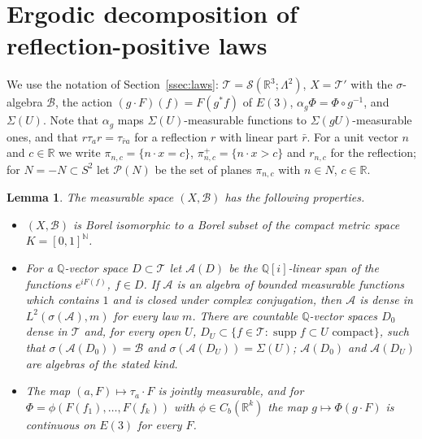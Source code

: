 \documentclass[11pt]{amsart}
\theoremstyle{plain}
\newtheorem{lemma}[theorem]{Lemma}
\theoremstyle{definition}
\theoremstyle{remark}
\numberwithin{equation}{section}
\newcommand{\R}{\mathbb{R}}
\newcommand{\N}{\mathbb{N}}
\newcommand{\Q}{\mathbb{Q}}
\newcommand{\cA}{\mathcal{A}}
\newcommand{\cB}{\mathcal{B}}
\newcommand{\cP}{\mathcal{P}}
\newcommand{\cT}{\mathcal{T}}
\newcommand{\cS}{\mathcal{S}}
\newcommand{\Eu}{E(3)}
\DeclareMathOperator{\supp}{supp}
\begin{document}
\appendix

\section{Ergodic decomposition of reflection-positive laws}\label{app:A}

We use the notation of Section~\ref{ssec:laws}: $\cT=\cS(\R^3;\Lambda^2)$, $X=\cT'$ with the $\sigma$-algebra $\cB$, the action $(g\cdot F)(f)=F(g^*f)$ of $\Eu$, $\alpha_g\Phi=\Phi\circ g^{-1}$, and $\Sigma(U)$. Note that $\alpha_g$ maps $\Sigma(U)$-measurable functions to $\Sigma(gU)$-measurable ones, and that $r\tau_ar=\tau_{\bar ra}$ for a reflection $r$ with linear part $\bar r$. For a unit vector $n$ and $c\in\R$ we write $\pi_{n,c}=\{n\cdot x=c\}$, $\pi_{n,c}^+=\{n\cdot x>c\}$ and $r_{n,c}$ for the reflection; for $N=-N\subset S^2$ let $\cP(N)$ be the set of planes $\pi_{n,c}$ with $n\in N$, $c\in\R$.

\begin{lemma}\label{lem:A-standard}
The measurable space $(X,\cB)$ has the following properties.
\begin{itemize}
\item[(a)] $(X,\cB)$ is Borel isomorphic to a Borel subset of the compact metric space $K=[0,1]^\N$.
\item[(b)] For a $\Q$-vector space $D\subset\cT$ let $\cA(D)$ be the $\Q[i]$-linear span of the functions $e^{iF(f)}$, $f\in D$. If $\cA$ is an algebra of bounded measurable functions which contains $1$ and is closed under complex conjugation, then $\cA$ is dense in $L^2(\sigma(\cA),m)$ for every law $m$. There are countable $\Q$-vector spaces $D_0$ dense in $\cT$ and, for every open $U$, $D_U\subset\{f\in\cT:\supp f\subset U\text{ compact}\}$, such that $\sigma(\cA(D_0))=\cB$ and $\sigma(\cA(D_U))=\Sigma(U)$; $\cA(D_0)$ and $\cA(D_U)$ are algebras of the stated kind.
\item[(c)] The map $(a,F)\mapsto\tau_a\cdot F$ is jointly measurable, and for $\Phi=\phi(F(f_1),\dots,F(f_k))$ with $\phi\in C_b(\R^k)$ the map $g\mapsto\Phi(g\cdot F)$ is continuous on $\Eu$ for every $F$.
\end{itemize}
\end{lemma}
\end{document}
